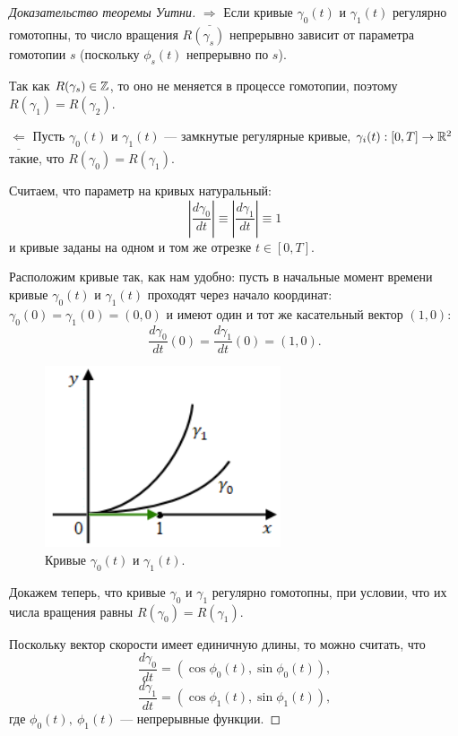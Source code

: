 \begin{proof}[Доказательство теоремы Уитни]
    $\underline{\Longrightarrow}$ 
    Если кривые $\gamma_0(t)$ и $\gamma_1(t)$ регулярно гомотопны, то число вращения $R(\gamma_s)$ непрерывно зависит от параметра гомотопии $s$ (поскольку $\phi_s(t)$ непрерывно по $s$).

    Так как $R(\gamma_s) \in \mathbb{Z}$, то оно не меняется в процессе гомотопии, поэтому $R(\gamma_1) = R(\gamma_2)$.

    $\underline{\Longleftarrow}$ 
    Пусть $\gamma_0(t)$ и $\gamma_1(t)$ — замкнутые регулярные кривые, $\gamma_i(t): [0,T] \to \mathbb{R}^2$ такие, что $R(\gamma_0) = R(\gamma_1)$.

    Считаем, что параметр на кривых натуральный:
    \[\left|\frac{d\gamma_0}{dt}\right| \equiv \left|\frac{d\gamma_1}{dt}\right| \equiv 1\]
    и кривые заданы на одном и том же отрезке $t \in [0,T]$.

    Расположим кривые так, как нам удобно: пусть в начальные момент времени кривые $\gamma_0(t)$ и $\gamma_1(t)$ проходят через начало координат: $\gamma_0(0) = \gamma_1(0) = (0,0)$ и имеют один и тот же касательный вектор $(1,0)$:
    \[\frac{d\gamma_0}{dt}(0) = \frac{d\gamma_1}{dt}(0) = (1,0).\]

    \begin{figure}[ht]
        \centering
        \includegraphics[scale=0.7]{images/c13.1.png}
        \caption{Кривые $\gamma_0(t)$ и $\gamma_1(t)$.}
        \label{fig:c13.1}
    \end{figure}

    Докажем теперь, что кривые $\gamma_0$ и $\gamma_1$ регулярно гомотопны, при условии, что их числа вращения равны $R(\gamma_0) = R(\gamma_1)$.

    Поскольку вектор скорости имеет единичную длины, то можно считать, что
    \[\frac{d\gamma_0}{dt} = (\cos{\phi_0(t)}, \sin{\phi_0(t)}),\]
    \[\frac{d\gamma_1}{dt} = (\cos{\phi_1(t)}, \sin{\phi_1(t)}),\]
    где $\phi_0(t), \ \phi_1(t)$ — непрерывные функции.


\end{proof}
